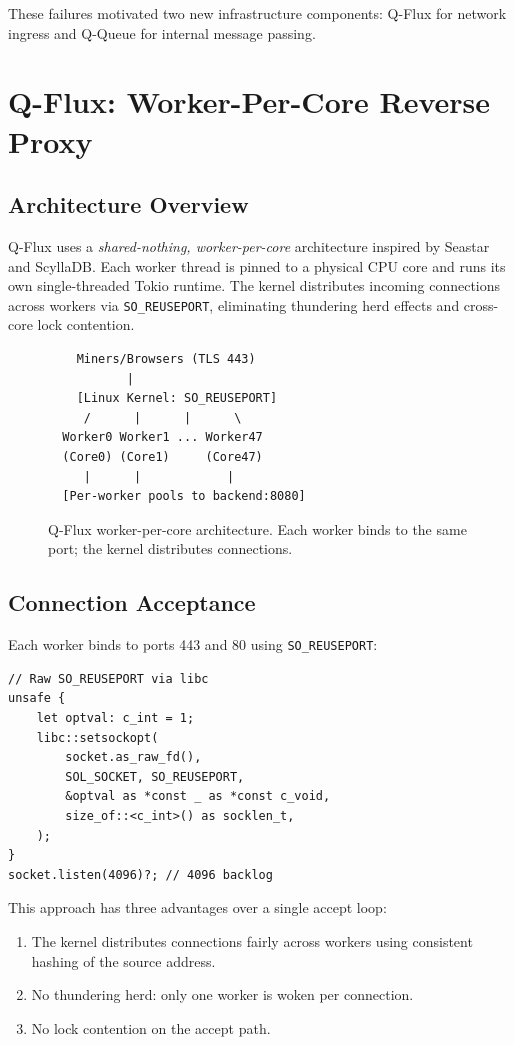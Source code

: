 \documentclass[11pt,a4paper,twocolumn]{article}
\begin{document}
These failures motivated two new infrastructure components: Q-Flux for network ingress and Q-Queue for internal message passing.

\section{Q-Flux: Worker-Per-Core Reverse Proxy}

\subsection{Architecture Overview}

Q-Flux uses a \textit{shared-nothing, worker-per-core} architecture inspired by Seastar~\cite{seastar} and ScyllaDB. Each worker thread is pinned to a physical CPU core and runs its own single-threaded Tokio runtime. The kernel distributes incoming connections across workers via \texttt{SO\_REUSEPORT}, eliminating thundering herd effects and cross-core lock contention.

\begin{figure}[H]
\centering
\begin{verbatim}
    Miners/Browsers (TLS 443)
           |
    [Linux Kernel: SO_REUSEPORT]
     /      |      |      \
  Worker0 Worker1 ... Worker47
  (Core0) (Core1)     (Core47)
     |      |            |
  [Per-worker pools to backend:8080]
\end{verbatim}
\caption{Q-Flux worker-per-core architecture. Each worker binds to the same port; the kernel distributes connections.}
\label{fig:architecture}
\end{figure}

\subsection{Connection Acceptance}

Each worker binds to ports 443 and 80 using \texttt{SO\_REUSEPORT}:

\begin{lstlisting}
// Raw SO_REUSEPORT via libc
unsafe {
    let optval: c_int = 1;
    libc::setsockopt(
        socket.as_raw_fd(),
        SOL_SOCKET, SO_REUSEPORT,
        &optval as *const _ as *const c_void,
        size_of::<c_int>() as socklen_t,
    );
}
socket.listen(4096)?; // 4096 backlog
\end{lstlisting}

This approach has three advantages over a single accept loop:
\begin{enumerate}[nosep]
\item The kernel distributes connections fairly across workers using consistent hashing of the source address.
\item No thundering herd: only one worker is woken per connection.
\item No lock contention on the accept path.
\end{enumerate}
\end{document}
